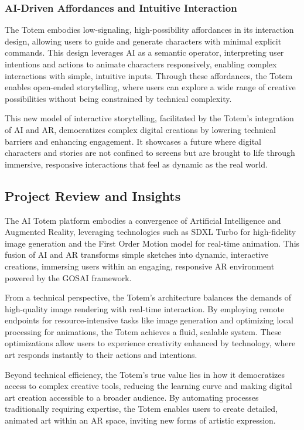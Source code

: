 \subsubsection{AI-Driven Affordances and Intuitive Interaction}
The Totem embodies low-signaling, high-possibility affordances in its interaction design, allowing users to guide and generate characters with minimal explicit commands.
This design leverages AI as a semantic operator, interpreting user intentions and actions to animate characters responsively, enabling complex interactions with simple, intuitive inputs.
Through these affordances, the Totem enables open-ended storytelling, where users can explore a wide range of creative possibilities without being constrained by technical complexity.

This new model of interactive storytelling, facilitated by the Totem’s integration of AI and AR, democratizes complex digital creations by lowering technical barriers and enhancing engagement.
It showcases a future where digital characters and stories are not confined to screens but are brought to life through immersive, responsive interactions that feel as dynamic as the real world.

\subsection{Project Review and Insights }
The AI Totem platform embodies a convergence of Artificial Intelligence and Augmented Reality, leveraging technologies such as SDXL Turbo for high-fidelity image generation and the First Order Motion model for real-time animation.
This fusion of AI and AR transforms simple sketches into dynamic, interactive creations, immersing users within an engaging, responsive AR environment powered by the GOSAI framework.

From a technical perspective, the Totem’s architecture balances the demands of high-quality image rendering with real-time interaction.
By employing remote endpoints for resource-intensive tasks like image generation and optimizing local processing for animations, the Totem achieves a fluid, scalable system.
These optimizations allow users to experience creativity enhanced by technology, where art responds instantly to their actions and intentions.

Beyond technical efficiency, the Totem’s true value lies in how it democratizes access to complex creative tools, reducing the learning curve and making digital art creation accessible to a broader audience.
By automating processes traditionally requiring expertise, the Totem enables users to create detailed, animated art within an AR space, inviting new forms of artistic expression.

